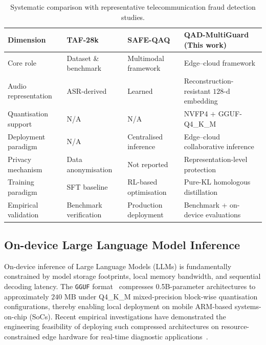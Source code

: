 \documentclass[a4paper,fleqn]{cas-sc}
\begin{document}
\begin{table}[t]
\centering
\caption{Systematic comparison with representative telecommunication fraud detection studies.}
\label{tab1}
\renewcommand{\arraystretch}{1.15}
\setlength{\tabcolsep}{8pt}
\begin{tabular}{@{} m{3cm} m{3.5cm} m{3.2cm} m{5cm} @{}}
\toprule
\textbf{Dimension} 
& \textbf{TAF-28k\newline\citep{1}} &\textbf{SAFE-QAQ\newline\citep{2}} 
& \textbf{QAD-MultiGuard (This work)}\\
\midrule
Core role 
& Dataset \& benchmark & Multimodal framework & Edge--cloud framework \\
\addlinespace[2pt]
Audio representation & ASR-derived & Learned & Reconstruction-resistant $128\text{-d}$ embedding \\
\addlinespace[2pt] Quantisation support & N/A & N/A & NVFP4 $+$ GGUF-Q4\_K\_M \\
\addlinespace[2pt] Deployment paradigm  & N/A & Centralised inference  & Edge--cloud collaborative inference \\
\addlinespace[2pt]
Privacy mechanism 
& Data anonymisation 
& Not reported 
& Representation-level protection \\
\addlinespace[2pt]
Training paradigm 
& SFT baseline 
& RL-based optimisation 
& Pure-KL homologous distillation \\
\addlinespace[2pt]
Empirical validation 
& Benchmark verification 
& Production deployment& Benchmark + on-device evaluations \\
\bottomrule
\end{tabular}
\end{table}

\subsection{On-device Large Language Model Inference}

On-device inference of Large Language Models (LLMs) is fundamentally constrained by model storage footprints, local memory bandwidth, and sequential decoding latency. The \texttt{GGUF} format~\citep{17} compresses 0.5B-parameter architectures to approximately $240\text{~MB}$ under Q4\_K\_M mixed-precision block-wise quantisation configurations, thereby enabling local deployment on mobile ARM-based systems-on-chip (SoCs). Recent empirical investigations have demonstrated the engineering feasibility of deploying such compressed architectures on resource-constrained edge hardware for real-time diagnostic applications~\citep{PereiraESWA2025}.
\end{document}
